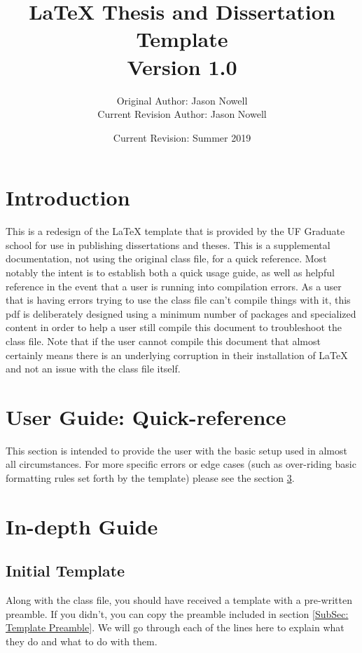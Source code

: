\documentclass{article}
\title{\LaTeX{} Thesis and Dissertation Template\\ Version 1.0}
\author{Original Author: Jason Nowell \\ Current Revision Author: Jason Nowell}
\date{Current Revision: Summer 2019}
\begin{document}
\maketitle
\tableofcontents
\newpage


\section{Introduction}
    This is a redesign of the \LaTeX{} template that is provided by the UF Graduate school for use in publishing dissertations and theses. This is a supplemental documentation, not using the original class file, for a quick reference. Most notably the intent is to establish both a quick usage guide, as well as helpful reference in the event that a user is running into compilation errors. As a user that is having errors trying to use the class file can't compile things with it, this pdf is deliberately designed using a minimum number of packages and specialized content in order to help a user still compile this document to troubleshoot the class file. Note that if the user cannot compile this document that almost certainly means there is an underlying corruption in their installation of \LaTeX{} and not an issue with the class file itself.

\section{User Guide: Quick-reference}
    This section is intended to provide the user with the basic setup used in almost all circumstances. For more specific errors or edge cases (such as over-riding basic formatting rules set forth by the template) please see the section \ref{Sec: In-Depth Guide}. 
    

        
        
        
        

\section{In-depth Guide}\label{Sec: In-Depth Guide}

    \subsection{Initial Template}
    
        Along with the class file, you should have received a template with a pre-written preamble. If you didn't, you can copy the preamble included in section \ref{SubSec: Template Preamble}. We will go through each of the lines here to explain what they do and what to do with them.
        
\end{document}
